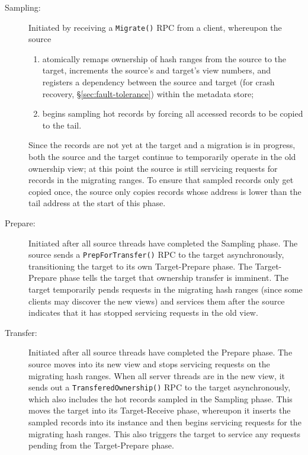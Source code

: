 \begin{description}
\item[Sampling:]
Initiated by receiving a \texttt{Migrate()} RPC from a client, whereupon the source
\begin{enumerate}
  \item atomically remaps ownership of hash ranges from the source to the
    target, increments the source's and target's view numbers, and registers a
    dependency between the source and target (for crash recovery,
    \S\ref{sec:fault-tolerance}) within the metadata store;
  \item begins sampling hot records by forcing all accessed
    records to be copied to the \hlog tail.
\end{enumerate}

Since the records are not yet at the target and a migration is in
progress, both the source and the target continue to temporarily operate in the
old ownership view; at this point the source is still servicing requests for
records in the migrating ranges.
%
To ensure that sampled records only get copied once, the source only copies
records whose address is lower than the \hlog tail address at the start of this
phase.

\item[Prepare:]
Initiated after all source threads have completed the Sampling phase.
%
The source sends a \texttt{PrepForTransfer()} RPC to the target asynchronously,
transitioning the target to its own Target-Prepare phase.
The Target-Prepare phase tells the target that ownership transfer is
imminent. The target temporarily pends requests in the migrating hash
ranges (since some clients may discover the new views) and
services them after the source indicates that it has stopped servicing
requests in the old view.

\item[Transfer:]
Initiated after all source threads have completed the Prepare phase.
%
The source moves into its new view and stops servicing requests on the
migrating hash ranges.
%
When all server threads are in the new view, it sends out a
\texttt{TransferedOwnership()} RPC to the target asynchronously, which also
includes the hot records sampled in the Sampling phase.
%
This moves the target into its Target-Receive phase, whereupon it inserts the sampled
records into its \faster instance and then begins servicing requests for
the migrating hash ranges.
%
This also triggers the target to service any requests pending from the
Target-Prepare phase.


\end{description}
